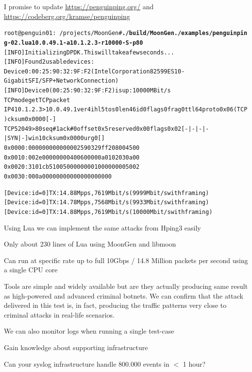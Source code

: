 \documentclass[Screen16to9,17pt]{foils}
\begin{document}
I promise to update \url{https://penguinping.org/} and \url{https://codeberg.org/kramse/penguinping}



\begin{alltt}\footnotesize
root@penguin01:~/projects/MoonGen# {\bfseries ./build/MoonGen ./examples/penguinping-02.lua 10.0.49.1 -a 10.1.2.3 -r 10000 -S -p 80}
[INFO]  Initializing DPDK. This will take a few seconds...
[INFO]  Found 2 usable devices:
   Device 0: 00:25:90:32:9F:F2 (Intel Corporation 82599ES 10-Gigabit SFI/SFP+ Network Connection)
[INFO]  Device 0 (00:25:90:32:9F:F2) is up: 10000 MBit/s
TCP mode get TCP packet
IP4 10.1.2.3 > 10.0.49.1 ver 4 ihl 5 tos 0 len 46 id 0 flags 0 frag 0 ttl 64 proto 0x06 (TCP) cksum 0x0000 [-]
TCP 52049 > 80 seq# 1 ack# 0 offset 0x5 reserved 0x00 flags 0x02 [-|-|-|-|SYN|-] win 10 cksum 0x0000 urg 0 []
  0x0000:   0000 0000 0000 0025 9032 9ff2 0800 4500
  0x0010:   002e 0000 0000 4006 0000 0a01 0203 0a00
  0x0020:   3101 cb51 0050 0000 0001 0000 0000 5002
  0x0030:   000a 0000 0000 0000 0000 0000

[Device: id=0] TX: 14.88 Mpps, 7619 Mbit/s (9999 Mbit/s with framing)
[Device: id=0] TX: 14.78 Mpps, 7568 Mbit/s (9933 Mbit/s with framing)
[Device: id=0] TX: 14.88 Mpps, 7619 Mbit/s (10000 Mbit/s with framing)
\end{alltt}

\begin{list2}
\item Using Lua we can implement the same attacks from Hping3 easily
\item Only about 230 lines of Lua using MoonGen and libmoon
\item Can run at specific rate up to full 10Gbps / 14.8 Million packets per second using a single CPU core
\end{list2}



Tools are simple and widely available but are they actually producing same result
as high-powered and advanced criminal botnets. We can confirm that the attack
delivered in this test is, in fact, producing the traffic patterns very close to
criminal attacks in real-life scenarios.

\begin{list2}
\item We can also monitor logs when running a single test-case
\item Gain knowledge about supporting infrastructure
\item Can your syslog infrastructure handle 800.000 events in $<$ 1 hour?
\end{list2}
\end{document}
